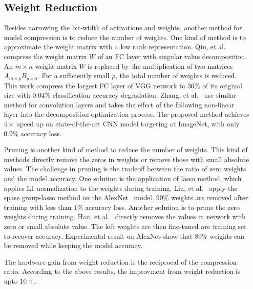 

\subsection{Weight Reduction}\label{sec:software:wr}
Besides narrowing the bit-width of activations and weights, another method for model compression is to reduce the number of weights. One kind of method is to approximate the weight matrix with a low rank representation. Qiu, et al.~\cite{qiu2016going} compress the weight matrix $W$ of an FC layer with singular value decomposition. An $m\times n$ weight matrix $W$ is replaced by the multiplication of two matrices $A_{m\times p}B_{p\times n}$. For a sufficiently small $p$, the total number of weights is reduced. This work compress the largest FC layer of VGG network to $36\%$ of its original size with $0.04\%$ classification accuracy degradation. Zhang, et al.~\cite{zhang2015efficient} use similar method for convolution layers and takes the effect of the following non-linear layer into the decomposition optimization process. The proposed method achieves $4\times$ speed up on state-of-the-art CNN model targeting at ImageNet, with only $0.9\%$ accuracy loss.

Pruning is another kind of method to reduce the number of weights. This kind of methods directly remove the zeros in weights or remove those with small absolute values. The challenge in pruning is the tradeoff between the ratio of zero weights and the model accuracy. One solution is the application of lasso method, which applies L1 normalization to the weights during training. Liu, et al.~\cite{liu2015sparse} apply the spase group-lasso method on the AlexNet~\cite{krizhevsky2012imagenet} model. $90\%$ weights are removed after training with less than $1\%$ accuracy loss. Another solution is to prune the zero weights during training. Han, et al.~\cite{han2015deep} directly removes the values in network with zero or small absolute value. The left weights are then fine-tuned are training set to recover accuracy. Experimental result on AlexNet show that $89\%$ weights can be removed while keeping the model accuracy.

The hardware gain from weight reduction is the reciprocal of the compression ratio. According to the above results, the improvment from weight reduction is upto $10\times$.